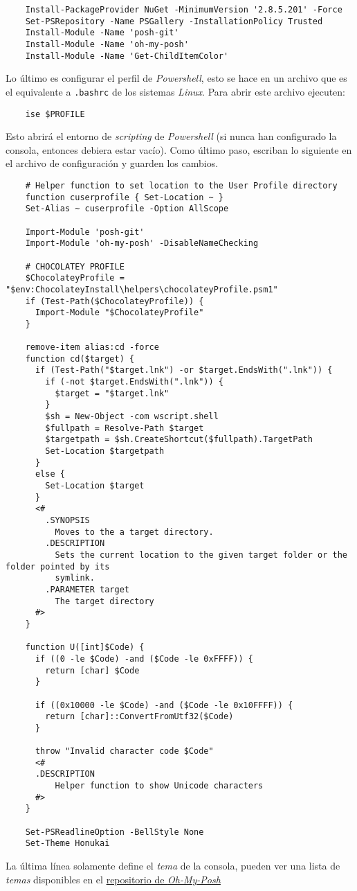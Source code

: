   \begin{verbatim}
    Install-PackageProvider NuGet -MinimumVersion '2.8.5.201' -Force
    Set-PSRepository -Name PSGallery -InstallationPolicy Trusted
    Install-Module -Name 'posh-git'
    Install-Module -Name 'oh-my-posh'
    Install-Module -Name 'Get-ChildItemColor'
  \end{verbatim}

  Lo último es configurar el perfil de \textit{Powershell}, esto se hace en un archivo que
  es el equivalente a \texttt{.bashrc} de los sistemas \textit{Linux}.
  Para abrir este archivo ejecuten:

  \begin{verbatim}
    ise $PROFILE
  \end{verbatim}

  Esto abrirá el entorno de \textit{scripting} de \textit{Powershell} (si nunca han 
  configurado la consola, entonces debiera estar vacío).
  Como último paso, escriban lo siguiente en el archivo de configuración y guarden los 
  cambios.

  \begin{verbatim}
    # Helper function to set location to the User Profile directory
    function cuserprofile { Set-Location ~ }
    Set-Alias ~ cuserprofile -Option AllScope

    Import-Module 'posh-git'
    Import-Module 'oh-my-posh' -DisableNameChecking

    # CHOCOLATEY PROFILE
    $ChocolateyProfile = "$env:ChocolateyInstall\helpers\chocolateyProfile.psm1"
    if (Test-Path($ChocolateyProfile)) {
      Import-Module "$ChocolateyProfile"
    }

    remove-item alias:cd -force
    function cd($target) {
      if (Test-Path("$target.lnk") -or $target.EndsWith(".lnk")) {
        if (-not $target.EndsWith(".lnk")) {
          $target = "$target.lnk"
        }
        $sh = New-Object -com wscript.shell
        $fullpath = Resolve-Path $target
        $targetpath = $sh.CreateShortcut($fullpath).TargetPath
        Set-Location $targetpath
      }
      else {
        Set-Location $target
      }
      <#
        .SYNOPSIS
          Moves to the a target directory.
        .DESCRIPTION
          Sets the current location to the given target folder or the folder pointed by its
          symlink.
        .PARAMETER target
          The target directory
      #>
    }

    function U([int]$Code) {
      if ((0 -le $Code) -and ($Code -le 0xFFFF)) {
        return [char] $Code
      }
    
      if ((0x10000 -le $Code) -and ($Code -le 0x10FFFF)) {
        return [char]::ConvertFromUtf32($Code)
      }
    
      throw "Invalid character code $Code"
      <#
      .DESCRIPTION
          Helper function to show Unicode characters
      #>
    }

    Set-PSReadlineOption -BellStyle None
    Set-Theme Honukai
  \end{verbatim}

  La última línea solamente define el \textit{tema} de la consola, pueden ver una lista de
  \textit{temas} disponibles en el 
  \href{https://github.com/JanDeDobbeleer/oh-my-posh#themes}{repositorio de \textit{Oh-My-Posh}}
%